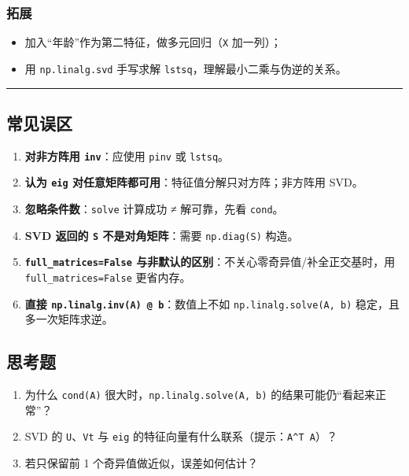 \subsubsection{拓展}\label{ux62d3ux5c55-7}

\begin{itemize}
\tightlist
\item
  加入``年龄''作为第二特征，做多元回归（\texttt{X} 加一列）；
\item
  用 \texttt{np.linalg.svd} 手写求解
  \texttt{lstsq}，理解最小二乘与伪逆的关系。
\end{itemize}

\begin{center}\rule{0.5\linewidth}{0.5pt}\end{center}

\subsection{常见误区}\label{ux5e38ux89c1ux8befux533a-3}

\begin{enumerate}
\def\labelenumi{\arabic{enumi}.}
\tightlist
\item
  \textbf{对非方阵用 \texttt{inv}}：应使用 \texttt{pinv} 或
  \texttt{lstsq}。
\item
  \textbf{认为 \texttt{eig}
  对任意矩阵都可用}：特征值分解只对方阵；非方阵用 SVD。
\item
  \textbf{忽略条件数}：\texttt{solve} 计算成功 ≠ 解可靠，先看
  \texttt{cond}。
\item
  \textbf{SVD 返回的 \texttt{S} 不是对角矩阵}：需要 \texttt{np.diag(S)}
  构造。
\item
  \textbf{\texttt{full\_matrices=False}
  与非默认的区别}：不关心零奇异值/补全正交基时，用
  \texttt{full\_matrices=False} 更省内存。
\item
  \textbf{直接 \texttt{np.linalg.inv(A)\ @\ b}}：数值上不如
  \texttt{np.linalg.solve(A,\ b)} 稳定，且多一次矩阵求逆。
\end{enumerate}

\subsection{思考题}\label{ux601dux8003ux9898-5}

\begin{enumerate}
\def\labelenumi{\arabic{enumi}.}
\tightlist
\item
  为什么 \texttt{cond(A)} 很大时，\texttt{np.linalg.solve(A,\ b)}
  的结果可能仍``看起来正常''？
\item
  SVD 的 \texttt{U}、\texttt{Vt} 与 \texttt{eig}
  的特征向量有什么联系（提示：\texttt{A\^{}T\ A}）？
\item
  若只保留前 1 个奇异值做近似，误差如何估计？
\end{enumerate}

